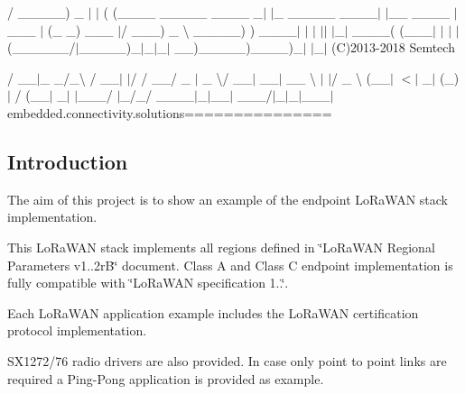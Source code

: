

 / \+\_\+\+\_\+\+\_\+\+\_\+\+\_\+) \+\_\+ $\vert$ $\vert$ ( (\+\_\+\+\_\+\+\_\+\+\_\+ \+\_\+\+\_\+\+\_\+\+\_\+\+\_\+ \+\_\+\+\_\+\+\_\+\+\_\+ \+\_\+$\vert$ $\vert$\+\_\+ \+\_\+\+\_\+\+\_\+\+\_\+\+\_\+ \+\_\+\+\_\+\+\_\+\+\_\+$\vert$ $\vert$\+\_\+\+\_\+ \+\_\+\+\_\+\+\_\+\+\_\+ $|$ \+\_\+\+\_\+\+\_\+ $\vert$ (\+\_\+ \+\_\+) \+\_\+\+\_\+\+\_\+ $\vert$/ \+\_\+\+\_\+\+\_\+) \+\_\+ \textbackslash{} \+\_\+\+\_\+\+\_\+\+\_\+\+\_\+) ) \+\_\+\+\_\+\+\_\+\+\_\+$\vert$ $\vert$ $\vert$ $\vert$$\vert$ $\vert$\+\_\+$\vert$ \+\_\+\+\_\+\+\_\+\+\_\+( (\+\_\+\+\_\+\+\_\+$\vert$ $\vert$ $\vert$ $\vert$ (\+\_\+\+\_\+\+\_\+\+\_\+\+\_\+\+\_\+/$\vert$\+\_\+\+\_\+\+\_\+\+\_\+\+\_\+)\+\_\+$\vert$\+\_\+$\vert$\+\_\+$\vert$ \+\_\+\+\_\+)\+\_\+\+\_\+\+\_\+\+\_\+\+\_\+)\+\_\+\+\_\+\+\_\+\+\_\+)\+\_\+$\vert$ $\vert$\+\_\+$\vert$ (C)2013-\/2018 Semtech



 / \+\_\+\+\_\+$\vert$\+\_\+ \+\_\+/\+\_\+\textbackslash{} / \+\_\+\+\_\+$\vert$ $\vert$/ / \+\_\+\+\_\+/ \+\_\+ $|$ \+\_\+ \textbackslash{}/ \+\_\+\+\_\+$\vert$ \+\_\+\+\_\+$\vert$ \+\_\+\+\_\+ \textbackslash{} $\vert$ $\vert$/ \+\_\+ \textbackslash{} (\+\_\+\+\_\+$\vert$ \textquotesingle{} $<$$\vert$ \+\_\+$\vert$ (\+\_\+) $\vert$ / (\+\_\+\+\_\+$\vert$ \+\_\+$\vert$ $\vert$\+\_\+\+\_\+\+\_\+/ $\vert$\+\_\+/\+\_\+/ \+\_\+\+\_\+\+\_\+\+\_\+$\vert$\+\_\+$\vert$\+\_\+\+\_\+$\vert$ \+\_\+\+\_\+\+\_\+/$\vert$\+\_\+$\vert$\+\_\+$\vert$\+\_\+\+\_\+\+\_\+$\vert$ embedded.\+connectivity.\+solutions===============

\subsection*{Introduction}

The aim of this project is to show an example of the endpoint Lo\+Ra\+W\+AN stack implementation.

This Lo\+Ra\+W\+AN stack implements all regions defined in \char`\"{}\+Lo\+Ra\+W\+A\+N Regional Parameters v1..\+2r\+B\char`\"{} document. Class A and Class C endpoint implementation is fully compatible with \char`\"{}\+Lo\+Ra\+W\+A\+N specification 1..\char`\"{}.

Each Lo\+Ra\+W\+AN application example includes the Lo\+Ra\+W\+AN certification protocol implementation.

S\+X1272/76 radio drivers are also provided. In case only point to point links are required a Ping-\/\+Pong application is provided as example.

